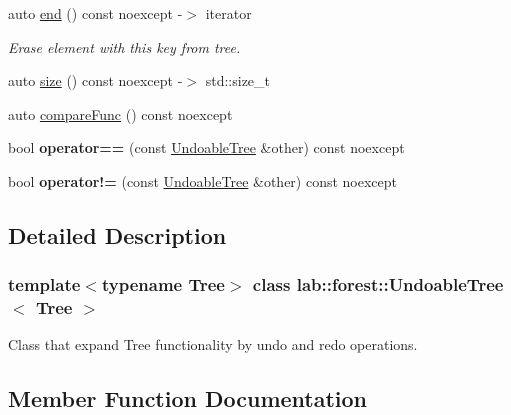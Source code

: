 \begin{DoxyCompactItemize}
auto \hyperlink{classlab_1_1forest_1_1UndoableTree_af404b6bb41ddad0291cf2ab22deee478}{end} () const noexcept -\/$>$ iterator
\begin{DoxyCompactList}\small\item\em Erase element with this key from tree. \end{DoxyCompactList}\item 
auto \hyperlink{classlab_1_1forest_1_1UndoableTree_a072971d83f1ef40d64f182f0246732ad}{size} () const noexcept -\/$>$ std\+::size\+\_\+t
\item 
auto \hyperlink{classlab_1_1forest_1_1UndoableTree_a359735c6419c5ec92e89f18a29d0a189}{compare\+Func} () const noexcept
\item 
\mbox{\label{classlab_1_1forest_1_1UndoableTree_a35bf2be1b8f96375aee133feef6447b9}} 
bool {\bfseries operator==} (const \hyperlink{classlab_1_1forest_1_1UndoableTree}{Undoable\+Tree} \&other) const noexcept
\item 
\mbox{\label{classlab_1_1forest_1_1UndoableTree_aaf614d1b26cca3a935adaf7badb2a493}} 
bool {\bfseries operator!=} (const \hyperlink{classlab_1_1forest_1_1UndoableTree}{Undoable\+Tree} \&other) const noexcept
\end{DoxyCompactItemize}


\subsection{Detailed Description}
\subsubsection*{template$<$typename Tree$>$\newline
class lab\+::forest\+::\+Undoable\+Tree$<$ Tree $>$}

Class that expand Tree functionality by undo and redo operations. 

\subsection{Member Function Documentation}
\mbox{\label{classlab_1_1forest_1_1UndoableTree_a359735c6419c5ec92e89f18a29d0a189}} 
